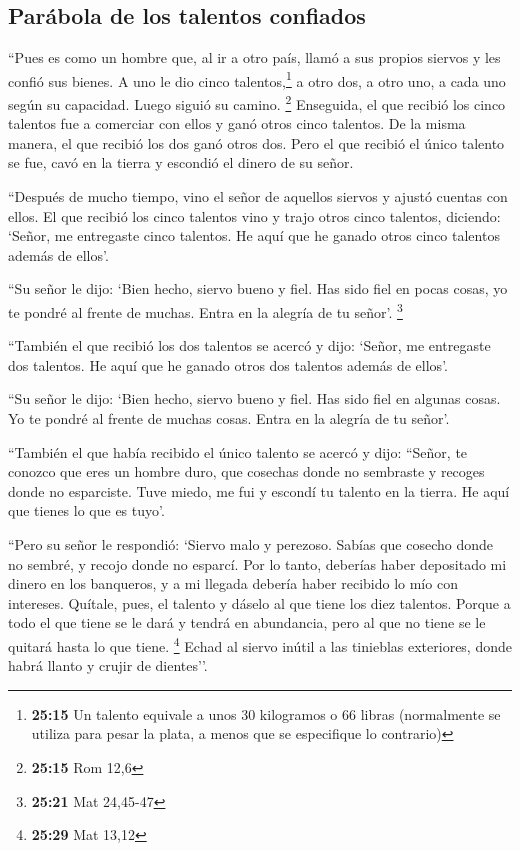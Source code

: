 \hypertarget{paruxe1bola-de-los-talentos-confiados}{%
\subsection{Parábola de los talentos
confiados}\label{paruxe1bola-de-los-talentos-confiados}}

 ``Pues es como un hombre que, al ir a otro país, llamó a
sus propios siervos y les confió sus bienes.  A uno le
dio cinco talentos,\footnote{\textbf{25:15} Un talento equivale a unos
  30 kilogramos o 66 libras (normalmente se utiliza para pesar la plata,
  a menos que se especifique lo contrario)} a otro dos, a otro uno, a
cada uno según su capacidad. Luego siguió su camino. \footnote{\textbf{25:15}
  Rom 12,6}  Enseguida, el que recibió los cinco talentos
fue a comerciar con ellos y ganó otros cinco talentos. 
De la misma manera, el que recibió los dos ganó otros dos.
 Pero el que recibió el único talento se fue, cavó en la
tierra y escondió el dinero de su señor.

 ``Después de mucho tiempo, vino el señor de aquellos
siervos y ajustó cuentas con ellos.  El que recibió los
cinco talentos vino y trajo otros cinco talentos, diciendo: `Señor, me
entregaste cinco talentos. He aquí que he ganado otros cinco talentos
además de ellos'.

 ``Su señor le dijo: `Bien hecho, siervo bueno y fiel.
Has sido fiel en pocas cosas, yo te pondré al frente de muchas. Entra en
la alegría de tu señor'. \footnote{\textbf{25:21} Mat 24,45-47}

 ``También el que recibió los dos talentos se acercó y
dijo: `Señor, me entregaste dos talentos. He aquí que he ganado otros
dos talentos además de ellos'.

 ``Su señor le dijo: `Bien hecho, siervo bueno y fiel.
Has sido fiel en algunas cosas. Yo te pondré al frente de muchas cosas.
Entra en la alegría de tu señor'.

 ``También el que había recibido el único talento se
acercó y dijo: ``Señor, te conozco que eres un hombre duro, que cosechas
donde no sembraste y recoges donde no esparciste.  Tuve
miedo, me fui y escondí tu talento en la tierra. He aquí que tienes lo
que es tuyo'.

 ``Pero su señor le respondió: `Siervo malo y perezoso.
Sabías que cosecho donde no sembré, y recojo donde no esparcí.
 Por lo tanto, deberías haber depositado mi dinero en los
banqueros, y a mi llegada debería haber recibido lo mío con intereses.
 Quítale, pues, el talento y dáselo al que tiene los diez
talentos.  Porque a todo el que tiene se le dará y tendrá
en abundancia, pero al que no tiene se le quitará hasta lo que tiene.
\footnote{\textbf{25:29} Mat 13,12}  Echad al siervo
inútil a las tinieblas exteriores, donde habrá llanto y crujir de
dientes''.

